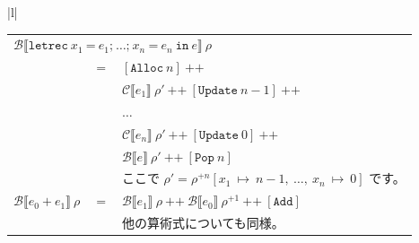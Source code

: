 \documentclass{jbook}
\begin{document}
\begin{tabular} {|l|}
\begin{tabular}{r c l}
		\multicolumn{3}{l}{$\mathcal{B} \llbracket \texttt{letrec} ~ x_1 ~ \texttt{=} ~ e_1\texttt{;} ~  \ldots \texttt{;} ~ x_n ~ \texttt{=} ~ e_n ~ \texttt{in} ~ e \rrbracket ~ \rho$}                                                                                             \\
		                                                                         & $=$ & $\left[\texttt{Alloc} ~ n\right] ~ \texttt{++}$                                                                                                                                              \\
		                                                                         &     & $\mathcal{C} \llbracket e_1 \rrbracket ~ \rho' ~ \texttt{++} ~ \left[\texttt{Update} ~ n - 1\right] ~ \texttt{++}$                                                                           \\
		                                                                         &     & $\ldots$                                                                                                                                                                                     \\
		                                                                         &     & $\mathcal{C} \llbracket e_n \rrbracket ~ \rho' ~ \texttt{++} ~ \left[\texttt{Update} ~ 0\right] ~ \texttt{++}$                                                                               \\
		                                                                         &     & $\mathcal{B} \llbracket e \rrbracket ~ \rho' ~ \texttt{++} ~ \left[\texttt{Pop} ~ n\right]$                                                                                                  \\
		                                                                         &     & ここで $\rho' = \rho^{+n} \left[x_1 ~ \mapsto ~ n - 1, ~ \ldots , ~ x_n ~ \mapsto ~ 0\right]$ です。                                                                                         \\
		$\mathcal{B} \llbracket e_0 ~ \texttt{+} ~ e_1 \rrbracket ~ \rho$        & $=$ & $\mathcal{B} \llbracket e_1 \rrbracket ~ \rho ~ \texttt{++} ~ \mathcal{B} \llbracket e_0 \rrbracket ~ \rho^{+1} ~ \texttt{++} ~ \left[\texttt{Add} \right]$                                  \\
		                                                                         &     & 他の算術式についても同様。                                                                                                                                                                   \\

\end{tabular}
\end{tabular}
\end{document}

